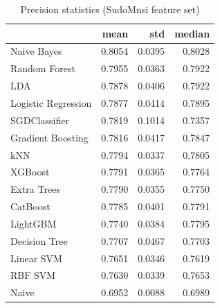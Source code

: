 \begin{table}
\caption{Precision statistics (SudoMnsi feature set)}
\label{tab:precision_SudoMnsi_stats}
\begin{tabular}{lrrr}
\toprule
 & mean & std & median \\
\midrule
Naive Bayes & 0.8054 & 0.0395 & 0.8028 \\
Random Forest & 0.7955 & 0.0363 & 0.7922 \\
LDA & 0.7878 & 0.0406 & 0.7922 \\
Logistic Regression & 0.7877 & 0.0414 & 0.7895 \\
SGDClassifier & 0.7819 & 0.1014 & 0.7357 \\
Gradient Boosting & 0.7816 & 0.0417 & 0.7847 \\
kNN & 0.7794 & 0.0337 & 0.7805 \\
XGBoost & 0.7791 & 0.0365 & 0.7764 \\
Extra Trees & 0.7790 & 0.0355 & 0.7750 \\
CatBoost & 0.7785 & 0.0401 & 0.7791 \\
LightGBM & 0.7740 & 0.0384 & 0.7795 \\
Decision Tree & 0.7707 & 0.0467 & 0.7703 \\
Linear SVM & 0.7651 & 0.0346 & 0.7619 \\
RBF SVM & 0.7630 & 0.0339 & 0.7653 \\
Naive & 0.6952 & 0.0088 & 0.6989 \\
\bottomrule
\end{tabular}
\end{table}
